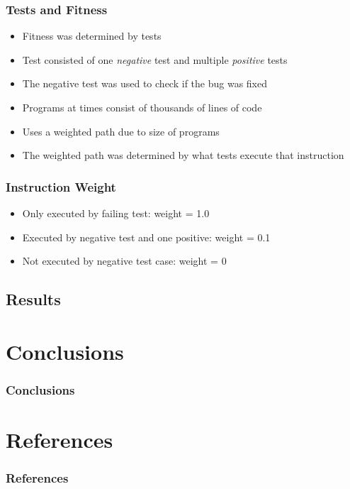 \documentclass{beamer}
\begin{document}
\begin{frame}
\frametitle{Tests and Fitness}
\begin{itemize}
	\item Fitness was determined by tests
	\item Test consisted of one \textit{negative} test and multiple \textit{positive} tests
	\item The negative test was used to check if the bug was fixed
\end{itemize}
\end{frame}

\begin{frame}
\begin{itemize}
   \item Programs at times consist of thousands of lines of code  
   \item Uses a weighted path due to size of programs
   \item The weighted path was determined by what tests execute that instruction
\end{itemize}
\end{frame}


\begin{frame}
  \frametitle{Instruction Weight}
  
    \begin{itemize}
  	\item Only executed by failing test: weight = 1.0
  	\item Executed by negative test and one positive: weight = 0.1
  	\item Not executed by negative test case: weight = 0
  \end{itemize}
\end{frame}

\subsection[Results]{Results}





\section[Conclusions]{Conclusions}

\begin{frame}
\frametitle{Conclusions}
\end{frame}


\begin{frame}
\cite{FINCH:2011}
\cite{Assembly:2010}
\end{frame}

\section*{References}

\begin{frame} 
	\frametitle{References} 
	
	
\end{frame} 
\end{document}
